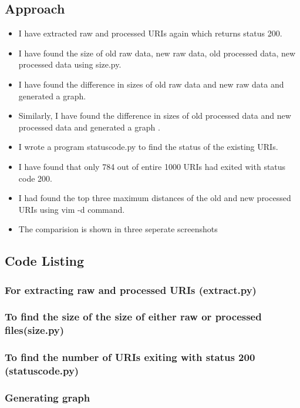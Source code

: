 \documentclass[12pt]{article}
\begin{document}
\subsection{Approach}
\begin{itemize}
\item I have extracted raw and processed URIs again which returns status 200.
\item I have found the size of old raw data, new raw data, old processed data, new processed data using size.py.
\item I have found the difference in sizes of old raw data and new raw data and generated a graph.
\item Similarly, I have found the difference in sizes of old processed data and new processed data and generated a graph .
\item I wrote a program statuscode.py to find the status of the existing URIs.
\item I have found that only 784 out of entire 1000 URIs had exited with status code 200.
\item I had found the top three maximum distances of the old and new processed URIs using vim -d command.
\item The  comparision is shown in three seperate screenshots



\end{itemize}
\subsection{Code Listing}
\subsubsection{For extracting raw and processed URIs (extract.py)}

\subsubsection{To find the size of the size of either raw or processed files(size.py)}

\subsubsection{To find the number of URIs exiting with status 200 (statuscode.py)}

\subsubsection{Generating graph}

\end{document}
